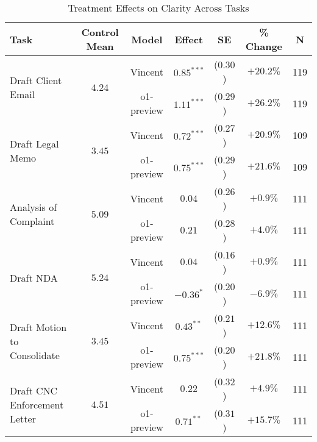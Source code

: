 \begin{table}[!htbp]
\centering
\caption{Treatment Effects on Clarity Across Tasks}
\label{tab:clarity_effects_controls}
\vspace{0.3cm}
\begin{tabular}{lcccccc}
\hline\hline
Task & Control Mean & Model & Effect & SE & \% Change & N \\
\hline
\multirow{2}{*}{Draft Client Email} & \multirow{2}{*}{$4.24$} & Vincent & $0.85^{***}$ & ($0.30$) & $+20.2\%$ & 119 \\
& & o1-preview & $1.11^{***}$ & ($0.29$) & $+26.2\%$ & 119 \\
\hline
\multirow{2}{*}{Draft Legal Memo} & \multirow{2}{*}{$3.45$} & Vincent & $0.72^{***}$ & ($0.27$) & $+20.9\%$ & 109 \\
& & o1-preview & $0.75^{***}$ & ($0.29$) & $+21.6\%$ & 109 \\
\hline
\multirow{2}{*}{Analysis of Complaint} & \multirow{2}{*}{$5.09$} & Vincent & $0.04$ & ($0.26$) & $+0.9\%$ & 111 \\
& & o1-preview & $0.21$ & ($0.28$) & $+4.0\%$ & 111 \\
\hline
\multirow{2}{*}{Draft NDA} & \multirow{2}{*}{$5.24$} & Vincent & $0.04$ & ($0.16$) & $+0.9\%$ & 111 \\
& & o1-preview & $-0.36^{*}$ & ($0.20$) & $-6.9\%$ & 111 \\
\hline
\multirow{2}{*}{Draft Motion to Consolidate} & \multirow{2}{*}{$3.45$} & Vincent & $0.43^{**}$ & ($0.21$) & $+12.6\%$ & 111 \\
& & o1-preview & $0.75^{***}$ & ($0.20$) & $+21.8\%$ & 111 \\
\hline
\multirow{2}{*}{Draft CNC Enforcement Letter} & \multirow{2}{*}{$4.51$} & Vincent & $0.22$ & ($0.32$) & $+4.9\%$ & 111 \\
& & o1-preview & $0.71^{**}$ & ($0.31$) & $+15.7\%$ & 111 \\
\hline
\hline\hline
\end{tabular}

\vspace{0.5cm}


\end{table}
